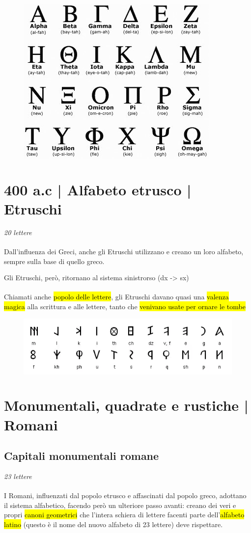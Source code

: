 \begin{figure}[H]
    \centering
    \includegraphics[width=0.3\linewidth]{lezione_3/imgs/6006_Una-passeggiata-nel-greco-antico.jpg}
\end{figure}

\section{400 a.c | Alfabeto etrusco | Etruschi}
{\huge \textit{20 lettere}}\\\\
Dall'influenza dei Greci, anche gli Etruschi utilizzano e creano un loro alfabeto, sempre sulla base di quello greco.

Gli Etruschi, però, ritornano al sistema sinistrorso (dx -> sx)
\\\\
Chiamati anche \hl{popolo delle lettere}, gli Etruschi davano quasi una \hl{valenza magica} alla scrittura e alle lettere, tanto che \hl{venivano usate per ornare le tombe}
\begin{figure}[H]
    \centering
    \includegraphics[width=0.5\linewidth]{lezione_3/imgs/alfabeto-etrusco1.png}
\end{figure}
\section{Monumentali, quadrate e rustiche | Romani}
\subsection{Capitali monumentali romane}
{\huge \textit{23 lettere}}\\\\

I Romani, influenzati dal popolo etrusco e affascinati dal popolo greco, adottano il sistema alfabetico, facendo però un ulteriore passo avanti: creano dei veri e propri \hl{canoni geometrici} che l'intera schiera di lettere facenti parte dell'\hl{alfabeto latino} (questo è il nome del nuovo alfabeto di 23 lettere) deve rispettare.

